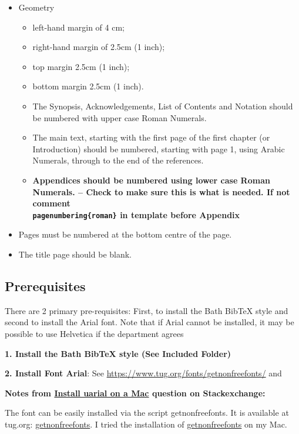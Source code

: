 \begin{itemize}
	\item Geometry
	\begin{itemize}
		\item left-hand margin of 4 cm;
		\item right-hand margin of 2.5cm (1 inch);
		\item top margin 2.5cm (1 inch);
		\item bottom margin 2.5cm (1 inch).
	\end{itemize}
	\begin{itemize}
		\item The Synopsis, Acknowledgements, List of Contents and Notation should be numbered with upper case Roman Numerals.
		\item The main text, starting with the first page of the first chapter (or Introduction) should be numbered, starting with page 1, using Arabic Numerals, through to the end of the references.
		\item \textbf{Appendices should be numbered using lower case Roman Numerals. -- Check to make sure this is what is needed. If not comment \texttt{\\pagenumbering\{roman\}} in template before Appendix}
	\end{itemize}
	\item Pages must be numbered at the bottom centre of the page.
	\item The title page should be blank.
\end{itemize}

\subsection{Prerequisites}

There are 2 primary pre-requisites: First, to install the Bath BibTeX style and second to install the Arial font. Note that if Arial cannot be installed, it may be possible to use Helvetica if the department agrees 

\textbf{1. Install the Bath BibTeX style (See Included Folder)}

\textbf{2. Install Font Arial}: See \hyperlink{https://www.tug.org/fonts/getnonfreefonts/}{https://www.tug.org/fonts/getnonfreefonts/} and 

\textbf{Notes from \hyperlink{https://tex.stackexchange.com/questions/37120/how-can-i-install-uarial-sty-on-a-mac}{Install uarial on a Mac} question on Stackexchange: }

The font can be easily installed via the script getnonfreefonts. It is available at tug.org: \hyperlink{http://www.tug.org/fonts/getnonfreefonts/}{getnonfreefonts}. I tried the installation of \hyperlink{http://www.tug.org/fonts/getnonfreefonts/install-getnonfreefonts}{getnonfreefonts} on my Mac.


